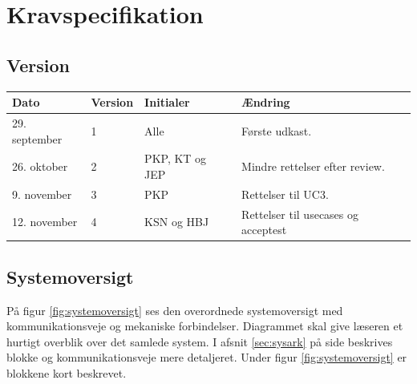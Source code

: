 \chapter{Kravspecifikation} \label{ch:kravspecifikation}
\section*{Version}
\begin{table}[h]
	\centering
	\begin{tabularx}{\textwidth - 2cm}{|l|l|l|X|}
	\hline
	Dato			& Version			& Initialer 		& Ændring										\\ \hline
	29. september 	& 1 				& Alle				& Første udkast. 								\\ \hline
	26. oktober		& 2 				& PKP, KT og JEP	& Mindre rettelser efter review.				\\ \hline
	9. november		& 3 				& PKP				& Rettelser til UC3. 							\\ \hline
	12. november	& 4 				& KSN og HBJ 		& Rettelser til usecases og acceptest			\\ \hline
	\end{tabularx}
\end{table}
\clearpage



\section{Systemoversigt} \label{sec:systemoversigt}
På figur \ref{fig:systemoversigt} ses den overordnede systemoversigt med kommunikationsveje og mekaniske forbindelser. Diagrammet skal give læseren et hurtigt overblik over det samlede system. 
I afsnit \ref{sec:sysark} på side \pageref{sec:sysark} beskrives blokke og kommunikationsveje mere detaljeret. 
Under figur \ref{fig:systemoversigt} er blokkene kort beskrevet. 

